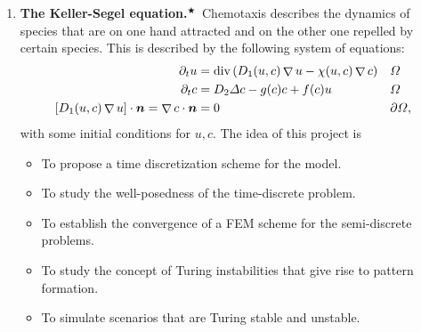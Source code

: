 \documentclass{article}
\renewcommand{\vec}{\vectorsym}
\DeclareMathOperator{\grad}{\nabla}
\DeclareMathOperator{\dive}{\text{div}}
\newcommand{\master}{$^\bigstar$}
\begin{document}
\begin{enumerate}
    \item \textbf{The Keller-Segel equation.}\master\ Chemotaxis describes the dynamics of species that are on one hand attracted and on the other one repelled by certain species. This is described by the following system of equations: 
        $$\begin{aligned}
            \partial_t u &= \dive\left(D_1(u,c)\grad u - \chi(u,c) \grad c\right) && \Omega \\
            \partial_t c &= D_2\Delta c - g(c) c + f(c) u && \Omega \\
            [D_1(u,c)\grad u]\cdot \vec n = \grad c\cdot \vec n &= 0 && \partial \Omega,
        \end{aligned} $$
        with some initial conditions for $u,c$. The idea of this project is
        \begin{itemize}
            \item To propose a time discretization scheme for the model.
            \item To study the well-posedness of the time-discrete problem.
            \item To establish the convergence of a FEM scheme for the semi-discrete problems.
            \item To study the concept of Turing instabilities that give rise to pattern formation.
            \item To simulate scenarios that are Turing stable and unstable.
        \end{itemize}


\end{enumerate}
\end{document}
